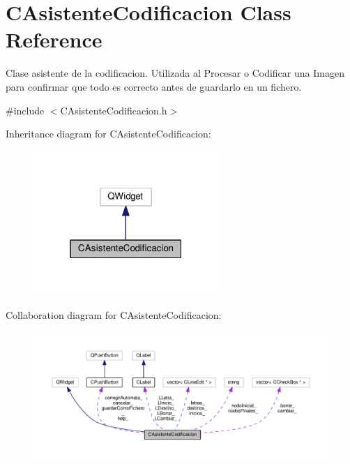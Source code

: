 \hypertarget{classCAsistenteCodificacion}{}\section{C\+Asistente\+Codificacion Class Reference}
\label{classCAsistenteCodificacion}


Clase asistente de la codificacion. Utilizada al Procesar o Codificar una Imagen para confirmar que todo es correcto antes de guardarlo en un fichero.  




{\ttfamily \#include $<$C\+Asistente\+Codificacion.\+h$>$}



Inheritance diagram for C\+Asistente\+Codificacion\+:\nopagebreak
\begin{figure}[H]
\begin{center}
\leavevmode
\includegraphics[width=199pt]{classCAsistenteCodificacion__inherit__graph}
\end{center}
\end{figure}


Collaboration diagram for C\+Asistente\+Codificacion\+:
\nopagebreak
\begin{figure}[H]
\begin{center}
\leavevmode
\includegraphics[width=350pt]{classCAsistenteCodificacion__coll__graph}
\end{center}
\end{figure}
